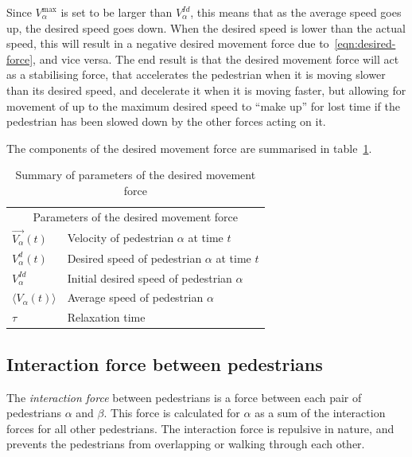 Since $V^{\text{max}}_\alpha$ is set to be larger than $V^{Id}_\alpha$, this
means that as the average speed goes up, the desired speed goes down.  When
the desired speed is lower than the actual speed, this will result in a
negative desired movement force due to~\eqref{eqn:desired-force}, and vice
versa. The end result is that the desired movement force will act as a
stabilising force, that accelerates the pedestrian when it is moving slower
than its desired speed, and decelerate it when it is moving faster, but
allowing for movement of up to the maximum desired speed to ``make up'' for
lost time if the pedestrian has been slowed down by the other forces acting on
it.

The components of the desired movement force are summarised in
table~\ref{tbl:desired-force}.

\begin{table}[h]
    \centering
    \begin{tabular}{l l}
        \toprule
        \multicolumn{2}{c}{\textsf{Parameters of the desired movement force}}\\
        $\overrightarrow{V_{\alpha}}(t)$ & Velocity of pedestrian $\alpha$
        at time $t$\\
        $V_{\alpha}^{d}(t)$ & Desired speed of pedestrian $\alpha$ at time
        $t$\\
        $V_{\alpha}^{Id}$ & Initial desired speed of pedestrian $\alpha$ \\
        $\langle V_{\alpha}(t) \rangle$ & Average speed of pedestrian
        $\alpha$ \\
        $\tau$& Relaxation time \\
        \bottomrule
    \end{tabular}
    \caption{Summary of parameters of the desired movement force}
    \label{tbl:desired-force}
\end{table}

\subsection{Interaction force between pedestrians}
\label{seq:interaction-pedestrians}
The \emph{interaction force} between pedestrians is a force between each pair
of pedestrians $\alpha$ and $\beta$. This force is calculated for $\alpha$ as
a sum of the interaction forces for all other pedestrians. The interaction
force is repulsive in nature, and prevents the pedestrians from overlapping or
walking through each other.

